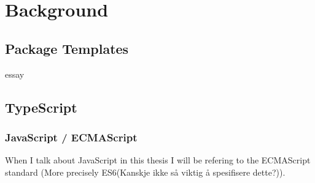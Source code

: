 
\chapter{Background}\label{ch:background}

\section{Package Templates}\label{sec:package-templates}

essay

\section{TypeScript}\label{sec:typescript}

\subsection{JavaScript  / ECMAScript}\label{subsec:javascript}

When I talk about JavaScript in this thesis I will be refering to the ECMAScript standard (More precisely ES6(Kanskje ikke så viktig å spesifisere dette?)).